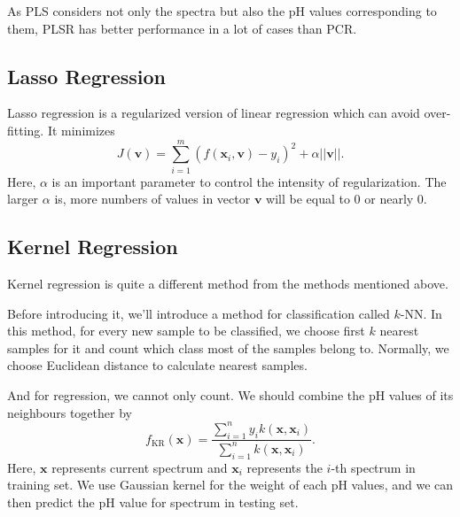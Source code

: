 \documentclass[a4paper]{article}
\newcommand{\bfv}{\mathbf{v}}
\newcommand{\bfx}{\mathbf{x}}
\begin{document}
As PLS considers not only the spectra but also the pH values corresponding to them, PLSR has better performance in a lot of cases than PCR.
\subsection{Lasso Regression}
Lasso regression \cite{tibshirani1996regression} is a regularized version of linear regression which can avoid over-fitting. It minimizes
\begin{equation}
J(\bfv)=\sum_{i=1}^m (f(\bfx_i,\bfv)-y_i)^2+\alpha ||\bfv||.
\end{equation}
Here, $\alpha$ is an important parameter to control the intensity of regularization. The larger $\alpha$ is, more numbers of values in vector $\bfv$ will be equal to 0 or nearly 0.
\subsection{Kernel Regression}
Kernel regression \cite{nadaraya1964estimating} is quite a different method from the methods mentioned above.

Before introducing it, we'll introduce a method for classification called $k$-NN. In this method, for every new sample to be classified, we choose first $k$ nearest samples for it and count which class most of the samples belong to. Normally, we choose Euclidean distance to calculate nearest samples.

And for regression, we cannot only count. We should combine the pH values of its neighbours together by
\begin{equation}
f_{\mathrm{KR}}(\bfx) = \frac{\displaystyle \sum_{i=1}^n y_ik(\bfx,\bfx_i)}{\displaystyle \sum_{i=1}^n k(\bfx,\bfx_i)}.
\end{equation}
Here, $\bfx$ represents current spectrum and $\bfx_i$ represents the $i$-th spectrum in training set. We use Gaussian kernel for the weight of each pH values, and we can then predict the pH value for spectrum in testing set.

 
\end{document}
